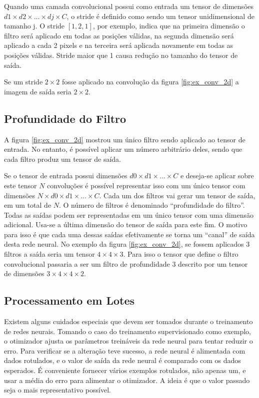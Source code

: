 Quando uma camada convolucional possui como entrada um tensor de dimensões
$d1\times d2 \times ... \times dj \times C$, o stride é definido como sendo
um tensor unidimensional de tamanho j.
O stride $[1,2,1]$, por exemplo, indica que na primeira dimensão o
filtro será aplicado em todas as posições válidas, na segunda dimensão será
aplicado a cada 2 pixels e na terceira será aplicada novamente em todas as
posições válidas. Stride maior que 1 causa redução no tamanho do tensor de
saída.

Se um stride $2 \times 2$ fosse aplicado na convolução da figura
\ref{fig:ex_conv_2d} a imagem de saída seria $2 \times 2$.

\subsection{Profundidade do Filtro}
A figura \ref{fig:ex_conv_2d} mostrou um único filtro sendo aplicado ao
tensor de entrada. No entanto, é possível aplicar um número arbitrário
deles, sendo que cada filtro produz um tensor de saída.

Se o tensor de entrada possui dimensões $d0 \times d1 \times ... \times C$
e deseja-se aplicar sobre este
tensor $N$ convoluções é possível representar isso com um único tensor
com dimensões
$N \times d0 \times d1 \times ... \times C$. Cada um dos filtros vai gerar
um tensor de saída, em um total de $N$. O
número de filtros é denominado “profundidade do filtro”. Todas as saídas podem
ser representadas em um único tensor com uma dimensão adicional. Usa-se a última
dimensão do tensor de saída para este fim. O motivo para isso é que cada uma
dessas saídas efetivamente se torna um “canal” de saída desta rede neural. No
exemplo da figura \ref{fig:ex_conv_2d}, se fossem aplicados 3 filtros a saída
seria um tensor $4 \times 4 \times 3$. Para isso o tensor que define o filtro
convolucional passaria a ser um
filtro de profundidade 3 descrito por um tensor de dimensões
$3 \times 4 \times 4 \times 2$.

\subsection{Processamento em Lotes}
Existem alguns cuidados especiais que devem ser tomados durante o treinamento de
redes neurais. Tomando o caso do treinamento supervisionado como exemplo, o
otimizador ajusta os parâmetros treináveis da rede neural para tentar reduzir o
erro. Para verificar se a alteração teve sucesso, a rede neural é
alimentada com
dados rotulados, e o valor de saída da rede neural é comparado com os dados
esperados. É conveniente fornecer vários exemplos rotulados, não apenas um, e
usar a média do erro para alimentar o otimizador. A ideia é que o valor passado
seja o mais representativo possível.

